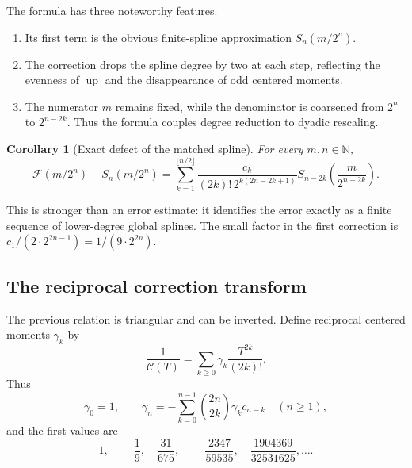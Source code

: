 \documentclass[11pt,oneside]{article}
\newtheorem{corollary}[theorem]{Corollary}
\theoremstyle{definition}
\theoremstyle{remark}
\newcommand{\N}{\mathbb N}
\newcommand{\Up}{\operatorname{up}}
\begin{document}
The formula has three noteworthy features.
\begin{enumerate}
\item Its first term is the obvious finite-spline approximation $S_n(m/2^n)$.
\item The correction drops the spline degree by two at each step, reflecting the evenness of
      $\Up$ and the disappearance of odd centered moments.
\item The numerator $m$ remains fixed, while the denominator is coarsened from $2^n$ to
      $2^{n-2k}$.  Thus the formula couples degree reduction to dyadic rescaling.
\end{enumerate}

\begin{corollary}[Exact defect of the matched spline]
\label{dyadicweb:cor:matched-defect}
For every $m,n\in\N$,
\begin{equation}
 \mathcal F(m/2^n)-S_n(m/2^n)
 =\sum_{k=1}^{\lfloor n/2\rfloor}
 \frac{c_k}{(2k)!\,2^{k(2n-2k+1)}}
 S_{n-2k}\!\left(\frac{m}{2^{n-2k}}\right).               \label{dyadicweb:eq:matched-defect}
\end{equation}
\end{corollary}

This is stronger than an error estimate: it identifies the error exactly as a finite sequence
of lower-degree global splines.  The small factor in the first correction is
$c_1/(2\cdot2^{2n-1})=1/(9\cdot2^{2n})$.

\subsection{The reciprocal correction transform}

The previous relation is triangular and can be inverted.  Define reciprocal centered moments
$\gamma_k$ by
\begin{equation}
 \frac1{\mathscr C(T)}=
 \sum_{k\ge0}\gamma_k\frac{T^{2k}}{(2k)!}.                \label{dyadicweb:eq:gamma-def}
\end{equation}
Thus
\begin{equation}
 \gamma_0=1,
 \qquad
 \gamma_n=-\sum_{k=0}^{n-1}\binom{2n}{2k}\gamma_kc_{n-k}
 \quad(n\ge1),                                             \label{dyadicweb:eq:gamma-recurrence}
\end{equation}
and the first values are
\begin{equation}
 1,\quad-\frac19,\quad\frac{31}{675},\quad
 -\frac{2347}{59535},\quad\frac{1904369}{32531625},\ldots. \label{dyadicweb:eq:gamma-values}
\end{equation}
\end{document}
